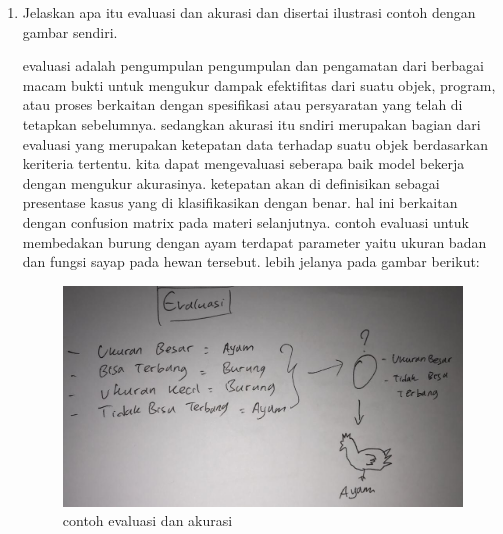 \begin{enumerate}
\item Jelaskan apa itu evaluasi dan akurasi dan disertai ilustrasi contoh dengan gambar sendiri.\par
evaluasi adalah pengumpulan pengumpulan dan pengamatan dari berbagai macam bukti untuk mengukur dampak efektifitas dari suatu objek, program, atau proses berkaitan  dengan spesifikasi atau persyaratan yang telah di tetapkan sebelumnya. sedangkan akurasi itu sndiri merupakan bagian dari evaluasi yang merupakan ketepatan data terhadap suatu objek berdasarkan keriteria tertentu. kita dapat mengevaluasi seberapa baik model bekerja dengan mengukur akurasinya. ketepatan akan di definisikan sebagai presentase kasus yang di klasifikasikan dengan benar. hal ini berkaitan dengan confusion matrix pada materi selanjutnya. contoh evaluasi untuk membedakan burung dengan ayam terdapat parameter yaitu ukuran badan dan fungsi sayap pada hewan tersebut. lebih jelanya pada gambar berikut:
\begin{figure}[ht]
\centering
\includegraphics[scale=0.2]{figures/1174042/chapter2/1,5.jpeg}
\caption{contoh evaluasi dan akurasi}
\label{contoh}
\end{figure}



\end{enumerate}
